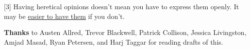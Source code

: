 [3]
                  Having heretical opinions doesn't mean you have to express
                  them openly. It may be
                  \href{http://www.paulgraham.com/say.html}{\underline{easier to have them}} if you
                  don't.


                  \textbf{Thanks} to Austen Allred, Trevor Blackwell, Patrick
                  Collison, Jessica Livingston, Amjad Masad, Ryan Petersen, and
                  Harj Taggar for reading drafts of this.


              
            
          
